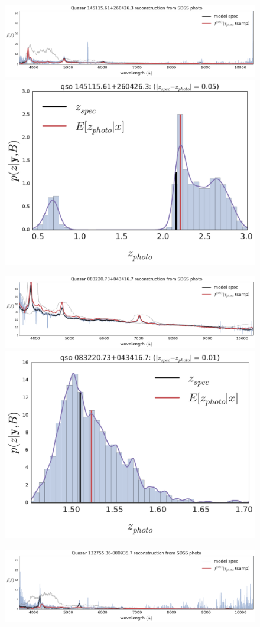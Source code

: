 \documentclass{article}
\begin{document}
\begin{figure}[t]
\centerline{
\includegraphics[width=1.5\columnwidth]{../../figs/quasar_plots/close_mid/quasar_282_mcmc_recon}
\includegraphics[width=.56\columnwidth]{../../figs/quasar_plots/close_mid/quasar_282_posterior_z}
}
\centerline{
\includegraphics[width=1.5\columnwidth]{../../figs/quasar_plots/close_mid/quasar_1119_mcmc_recon}
\includegraphics[width=.56\columnwidth]{../../figs/quasar_plots/close_mid/quasar_1119_posterior_z}
}
\centerline{
\includegraphics[width=1.5\columnwidth]{../../figs/quasar_plots/close_mid/quasar_1959_mcmc_recon}
}
\end{figure}
\end{document}
